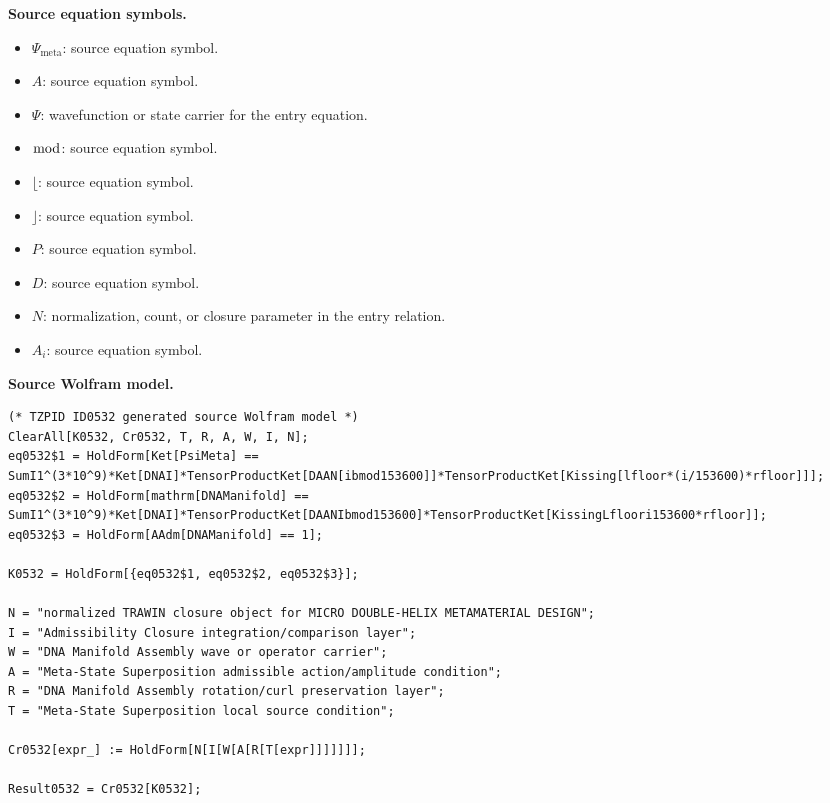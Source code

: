 \begin{minipage}[t]{0.49\linewidth}
\begingroup
\small
\raggedright
\textbf{Source equation symbols.}\par
\begin{itemize}[leftmargin=1.35em,itemsep=1pt,topsep=1pt,parsep=0pt]
    \item $\Psi_{\mathrm{meta}}$: source equation symbol.
    \item $A$: source equation symbol.
    \item $\Psi$: wavefunction or state carrier for the entry equation.
    \item $\bmod$: source equation symbol.
    \item $\lfloor$: source equation symbol.
    \item $\rfloor$: source equation symbol.
    \item $P$: source equation symbol.
    \item $D$: source equation symbol.
    \item $N$: normalization, count, or closure parameter in the entry relation.
    \item $A_{i}$: source equation symbol.
\end{itemize}
\endgroup
\end{minipage}\hfill
\begin{minipage}[t]{0.47\linewidth}
\begingroup
\scriptsize
\raggedright
\textbf{Source Wolfram model.}\par
\begin{Verbatim}[fontsize=\tiny,breaklines=true,breakanywhere=true]
(* TZPID ID0532 generated source Wolfram model *)
ClearAll[K0532, Cr0532, T, R, A, W, I, N];
eq0532$1 = HoldForm[Ket[PsiMeta] == SumI1^(3*10^9)*Ket[DNAI]*TensorProductKet[DAAN[ibmod153600]]*TensorProductKet[Kissing[lfloor*(i/153600)*rfloor]]];
eq0532$2 = HoldForm[mathrm[DNAManifold] == SumI1^(3*10^9)*Ket[DNAI]*TensorProductKet[DAANIbmod153600]*TensorProductKet[KissingLfloori153600*rfloor]];
eq0532$3 = HoldForm[AAdm[DNAManifold] == 1];

K0532 = HoldForm[{eq0532$1, eq0532$2, eq0532$3}];

N = "normalized TRAWIN closure object for MICRO DOUBLE-HELIX METAMATERIAL DESIGN";
I = "Admissibility Closure integration/comparison layer";
W = "DNA Manifold Assembly wave or operator carrier";
A = "Meta-State Superposition admissible action/amplitude condition";
R = "DNA Manifold Assembly rotation/curl preservation layer";
T = "Meta-State Superposition local source condition";

Cr0532[expr_] := HoldForm[N[I[W[A[R[T[expr]]]]]]];

Result0532 = Cr0532[K0532];
\end{Verbatim}
\endgroup
\end{minipage}

